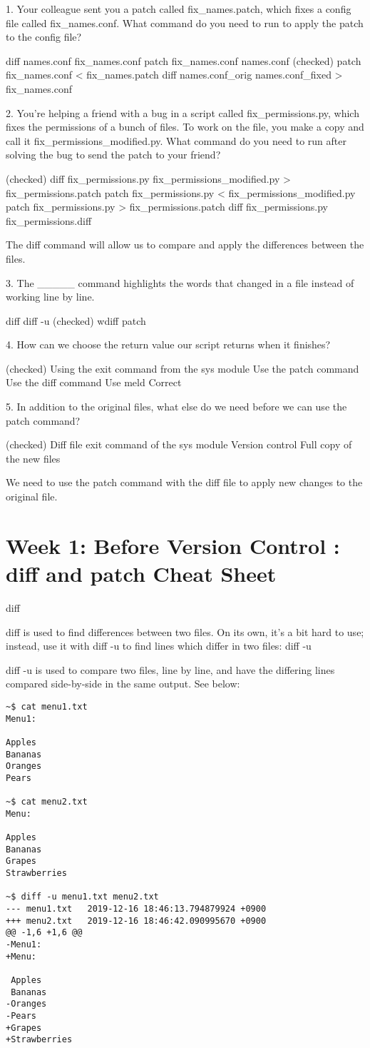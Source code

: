 \documentclass[11pt, onecolumn]{article}
\begin{document}
1. Your colleague sent you a patch called fix_names.patch, which fixes a config file called fix_names.conf. What command do you need to run to apply the patch to the config file?

diff names.conf fix_names.conf
patch fix_names.conf names.conf
(checked) patch fix_names.conf < fix_names.patch
diff names.conf_orig names.conf_fixed > fix_names.conf


2. You're helping a friend with a bug in a script called fix_permissions.py, which fixes the permissions of a bunch of files. To work on the file, you make a copy and call it fix_permissions_modified.py. What command do you need to run after solving the bug to send the patch to your friend?

(checked) diff fix_permissions.py fix_permissions_modified.py > fix_permissions.patch
patch fix_permissions.py < fix_permissions_modified.py
patch fix_permissions.py > fix_permissions.patch
diff fix_permissions.py fix_permissions.diff

The diff command will allow us to compare and apply the differences between the files.


3. The _____ command highlights the words that changed in a file instead of working line by line.

diff
diff -u
(checked) wdiff
patch


4. How can we choose the return value our script returns when it finishes?

(checked) Using the exit command from the sys module
Use the patch command
Use the diff command 
Use meld
Correct


5. In addition to the original files, what else do we need before we can use the patch command?

(checked) Diff file
exit command of the sys module
Version control
Full copy of the new files

We need to use the patch command with the diff file to apply new changes to the original file.


\section{Week 1: Before Version Control : diff and patch Cheat Sheet}
diff

diff is used to find differences between two files. On its own, it’s a bit hard to use; instead, use it with diff -u to find lines which differ in two files:
diff -u

diff -u is used to compare two files, line by line, and have the differing lines compared side-by-side in the same output. See below:
\begin{verbatim}
~$ cat menu1.txt 
Menu1:

Apples
Bananas
Oranges
Pears

~$ cat menu2.txt 
Menu:

Apples
Bananas
Grapes
Strawberries

~$ diff -u menu1.txt menu2.txt 
--- menu1.txt   2019-12-16 18:46:13.794879924 +0900
+++ menu2.txt   2019-12-16 18:46:42.090995670 +0900
@@ -1,6 +1,6 @@
-Menu1:
+Menu:
 
 Apples
 Bananas
-Oranges
-Pears
+Grapes
+Strawberries
\end{verbatim}
\end{document}
